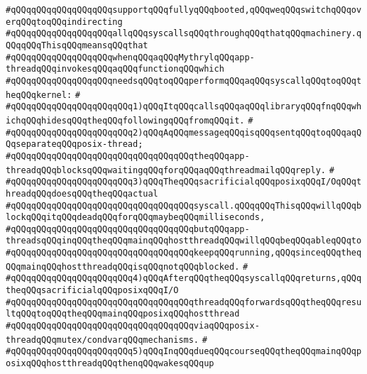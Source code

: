 \verb|#qQQqqQQqqQQqqQQqqQQqsupportqQQqfullyqQQqbooted,qQQqweqQQqswitchqQQqoverqQQqtoqQQqindirecting|\newline
\verb|#qQQqqQQqqQQqqQQqqQQqallqQQqsyscallsqQQqthroughqQQqthatqQQqmachinery.qQQqqQQqThisqQQqmeansqQQqthat|\newline
\verb|#qQQqqQQqqQQqqQQqqQQqwhenqQQqaqQQqMythrylqQQqapp-threadqQQqinvokesqQQqaqQQqfunctionqQQqwhich|\newline
\verb|#qQQqqQQqqQQqqQQqqQQqneedsqQQqtoqQQqperformqQQqaqQQqsyscallqQQqtoqQQqtheqQQqkernel:|\newline
\verb|#|\newline
\verb|#qQQqqQQqqQQqqQQqqQQqqQQq1)qQQqItqQQqcallsqQQqaqQQqlibraryqQQqfnqQQqwhichqQQqhidesqQQqtheqQQqfollowingqQQqfromqQQqit.|\newline
\verb|#|\newline
\verb|#qQQqqQQqqQQqqQQqqQQqqQQq2)qQQqAqQQqmessageqQQqisqQQqsentqQQqtoqQQqaqQQqseparateqQQqposix-thread;|\newline
\verb|#qQQqqQQqqQQqqQQqqQQqqQQqqQQqqQQqqQQqtheqQQqapp-threadqQQqblocksqQQqwaitingqQQqforqQQqaqQQqthreadmailqQQqreply.|\newline
\verb|#|\newline
\verb|#qQQqqQQqqQQqqQQqqQQqqQQq3)qQQqTheqQQqsacrificialqQQqposixqQQqI/OqQQqthreadqQQqdoesqQQqtheqQQqactual|\newline
\verb|#qQQqqQQqqQQqqQQqqQQqqQQqqQQqqQQqqQQqsyscall.qQQqqQQqThisqQQqwillqQQqblockqQQqitqQQqdeadqQQqforqQQqmaybeqQQqmilliseconds,|\newline
\verb|#qQQqqQQqqQQqqQQqqQQqqQQqqQQqqQQqqQQqbutqQQqapp-threadsqQQqinqQQqtheqQQqmainqQQqhostthreadqQQqwillqQQqbeqQQqableqQQqto|\newline
\verb|#qQQqqQQqqQQqqQQqqQQqqQQqqQQqqQQqqQQqkeepqQQqrunning,qQQqsinceqQQqtheqQQqmainqQQqhostthreadqQQqisqQQqnotqQQqblocked.|\newline
\verb|#|\newline
\verb|#qQQqqQQqqQQqqQQqqQQqqQQq4)qQQqAfterqQQqtheqQQqsyscallqQQqreturns,qQQqtheqQQqsacrificialqQQqposixqQQqI/O|\newline
\verb|#qQQqqQQqqQQqqQQqqQQqqQQqqQQqqQQqqQQqthreadqQQqforwardsqQQqtheqQQqresultqQQqtoqQQqtheqQQqmainqQQqposixqQQqhostthread|\newline
\verb|#qQQqqQQqqQQqqQQqqQQqqQQqqQQqqQQqqQQqviaqQQqposix-threadqQQqmutex/condvarqQQqmechanisms.|\newline
\verb|#|\newline
\verb|#qQQqqQQqqQQqqQQqqQQqqQQq5)qQQqInqQQqdueqQQqcourseqQQqtheqQQqmainqQQqposixqQQqhostthreadqQQqthenqQQqwakesqQQqup|\newline
